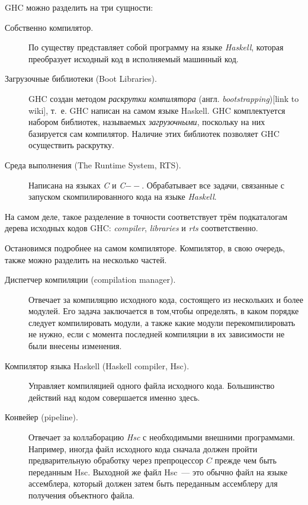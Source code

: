 GHC можно разделить на три сущности:
\begin{description}
\item[Собственно компилятор.] По существу представляет собой программу на языке \textit{Haskell}, которая преобразует исходный код в исполняемый машинный код.
\item[Загрузочные библиотеки (Boot Libraries).] GHC создан методом \textit{раскрутки компилятора} (англ. \textit{bootstrapping})[link to wiki], т.~е. GHC написан на самом языке Haskell. GHC комплектуется набором библиотек, называемых \textit{загрузочными}, поскольку на них базируется сам компилятор. Наличие этих библиотек позволяет GHC осуществить раскрутку.
\item[Среда выполнения (The Runtime System, RTS).] Написана на языках \textit{C} и \textit{C$--$}. Обрабатывает все задачи, связанные с запуском скомпилированного кода на языке \textit{Haskell}.
\end{description}
На самом деле, такое разделение в точности соответствует трём подкаталогам дерева исходных кодов GHC: \textit{compiler}, \textit{libraries} и \textit{rts} соответственно.

Остановимся подробнее на самом компиляторе. Компилятор, в свою очередь, также можно разделить на несколько частей.
\begin{description}
\item[Диспетчер компиляции (compilation manager).] Отвечает за компиляцию исходного кода, состоящего из нескольких и более модулей. Его задача заключается в том,чтобы определять, в каком порядке следует компилировать модули, а также какие модули перекомпилировать не нужно, если с момента последней компиляции в их зависимости не были внесены изменения.
\item[Компилятор языка Haskell (Haskell compiler, Hsc).] Управляет компиляцией одного файла исходного кода. Большинство действий над кодом совершается именно здесь.
\item[Конвейер (pipeline).] Отвечает за коллаборацию \textit{Hsc} с необходимыми внешними программами. Например, иногда файл исходного кода сначала должен пройти предварительную обработку через препроцессор $C$ прежде чем быть переданным Hsc. Выходной же файл Hsc~--- это обычно файл на языке ассемблера, который должен затем быть переданным ассемблеру для получения объектного файла.
\end{description}



